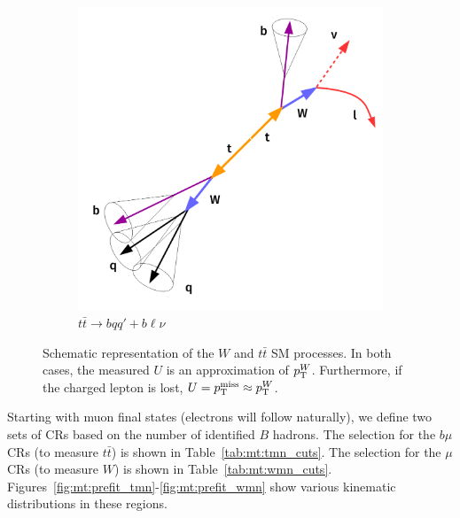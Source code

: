 \begin{figure}[]
\begin{center}
\begin{subfigure}[t]{0.49\textwidth}
            \includegraphics[width=\textwidth]{figures/monotop/diagrams/ttcr.pdf}
            \caption{$t\bar{t}\rightarrow bqq'+b\ell\nu$}
        \end{subfigure}
        \caption{Schematic representation of the $W$ and $t\bar{t}$ SM processes.
                 In both cases, the measured $U$ is an approximation of $p_\mathrm{T}^W$.
                 Furthermore, if the charged lepton is lost, $U = p_\mathrm{T}^\mathrm{miss} \approx p_\mathrm{T}^W$.}
        \label{fig:mt:wtt}
    \end{center}
\end{figure}

Starting with muon final states (electrons will follow naturally), we define two sets of CRs based on the number of identified $B$ hadrons.
The selection for the $b\mu$ CRs (to measure $t\bar{t}$) is shown in Table~\ref{tab:mt:tmn_cuts}.
The selection for the $\mu$ CRs (to measure $W$) is shown in Table~\ref{tab:mt:wmn_cuts}.
Figures~\ref{fig:mt:prefit_tmn}-\ref{fig:mt:prefit_wmn} show various kinematic distributions in these regions.

